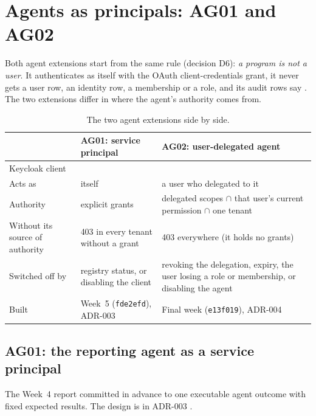 \section{Agents as principals: AG01 and AG02}
\label{sec:agents}

Both agent extensions start from the same rule (decision D6): \emph{a program is not a user}. It authenticates as itself with the OAuth client-credentials grant, it never gets a user row, an identity row, a membership or a role, and its audit rows say . The two extensions differ in where the agent's authority comes from.

\begin{table}[H]
\centering
\small
\begin{tabularx}{\textwidth}{@{}P{3.2cm} L L@{}}
\toprule
 & \textbf{AG01: service principal} & \textbf{AG02: user-delegated agent}\\
\midrule
Keycloak client &  & \\
Acts as & itself & a user who delegated to it\\
Authority & explicit grants  & delegated scopes $\cap$ that user's current permission $\cap$ one tenant\\
Without its source of authority & 403 in every tenant without a grant & 403 everywhere (it holds no grants)\\
Switched off by & registry status, or disabling the client & revoking the delegation, expiry, the user losing a role or membership, or disabling the agent\\
Built & Week~5 (\texttt{fde2efd}), ADR-003 & Final week (\texttt{e13f019}), ADR-004\\
\bottomrule
\end{tabularx}
\caption{The two agent extensions side by side.}
\end{table}

\subsection{AG01: the reporting agent as a service principal}
\label{sec:ag01}
The Week~4 report committed in advance to one executable agent outcome with fixed expected results. The design is in ADR-003 \cite{adr3}.

